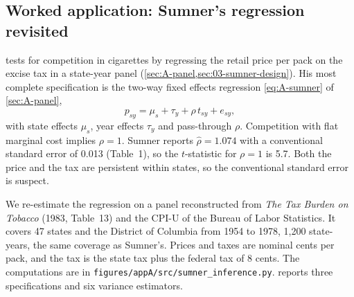 \subsection{Worked application: Sumner's regression revisited}\label{sec:A-sumner-se}

\citet{Sumner1981} tests for competition in cigarettes by regressing the retail price per pack on the excise tax in a
state-year panel (\cref{sec:A-panel,sec:03-sumner-design}). His most complete specification is the two-way fixed effects
regression \eqref{eq:A-sumner} of \cref{sec:A-panel},
\begin{equation*}
  p_{sy} = \mu_s + \tau_y + \rho\,t_{sy} + e_{sy},
\end{equation*}
with state effects $\mu_s$, year effects $\tau_y$ and pass-through $\rho$. Competition with flat marginal cost
implies $\rho = 1$. Sumner reports $\hat\rho = 1.074$ with a conventional standard error of 0.013 (Table~1), so the
$t$-statistic for $\rho = 1$ is 5.7. Both the price and the tax are persistent within states, so the
conventional standard error is suspect.

We re-estimate the regression on a panel reconstructed from \emph{The Tax Burden on Tobacco} (1983, Table~13) and
the CPI-U of the Bureau of Labor Statistics. It covers 47 states and the District of Columbia from 1954 to 1978,
1,200 state-years, the same coverage as Sumner's. Prices and taxes are nominal cents per pack, and the tax is the
state tax plus the federal tax of 8 cents. The computations are in \texttt{figures/appA/src/sumner\_inference.py}.
 reports three specifications and six variance estimators.

